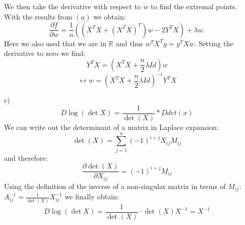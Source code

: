 \documentclass[10pt]{article}
\numberwithin{equation}{section}
\begin{document}
\begin{enumerate}
{$$$$
We then take the derivative with respect to $w$ to find the extremal points. With the results from $(a)$ we obtain:
$$
\frac{\partial f}{\partial w}=\frac{1}{n}( (X^TX + {(X^TX)}^T) w - 2Y^TX) + \lambda w.
$$
Here we also used that we are in $\mathbb{R}$ and thus $w^T X^Ty = y^TXw$. 
Setting the derivative to zero we find:
$$
Y^TX = \left( X^TX + \frac{n}{2}\lambda Id \right) w 
$$
$$
\leftrightarrow w = \left( X^TX + \frac{n}{2}\lambda Id \right)^{-1} Y^TX
$$}
\item[c)] {
$$D \log(\det{X}) = \frac{1}{\det(X)} * D det(x)$$
We can write out the determinant of a matrix in Laplace expansion:
$$
\det(X)= \sum_{j=1}^n (-1)^{i+j} X_{ij} M_{ij}
$$
and therefore:
$$
\frac{\partial \det(X)}{\partial X_{ij}} = (-1)^{i+j} M_{ij}
$$
Using the definition of the inverse of a non-singular matrix in terms of $M_{ij}$: $A^{-1}_{ij}= \frac{1}{\det(X)} X^{-1}_{ij}$ we finally obtain:
$$
D \log(\det{X}) = \frac{1}{\det(X)} \cdot \det(X) X^{-1} = X^{-1} $$
}
\end{enumerate}
\end{document}
